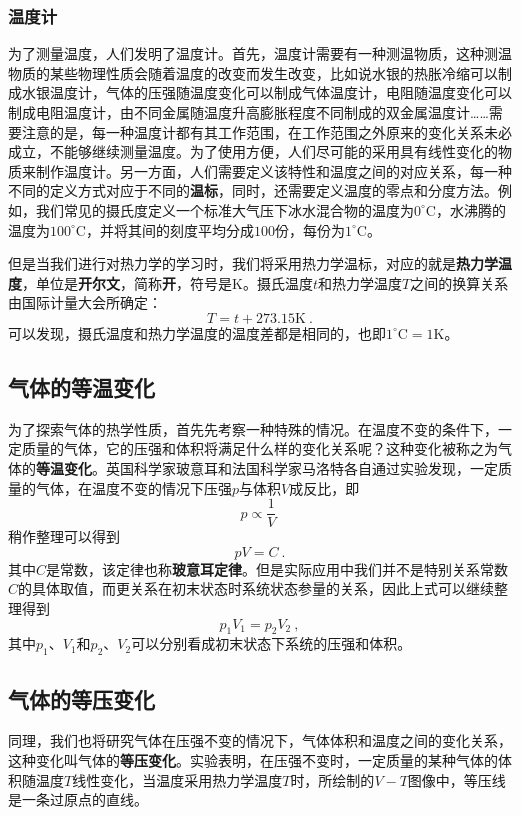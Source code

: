 \subsubsection{温度计}
为了测量温度，人们发明了温度计。首先，温度计需要有一种测温物质，这种测温物质的某些物理性质会随着温度的改变而发生改变，比如说水银的热胀冷缩可以制成水银温度计，气体的压强随温度变化可以制成气体温度计，电阻随温度变化可以制成电阻温度计，由不同金属随温度升高膨胀程度不同制成的双金属温度计……需要注意的是，每一种温度计都有其工作范围，在工作范围之外原来的变化关系未必成立，不能够继续测量温度。为了使用方便，人们尽可能的采用具有线性变化的物质来制作温度计。另一方面，人们需要定义该特性和温度之间的对应关系，每一种不同的定义方式对应于不同的\textbf{温标}，同时，还需要定义温度的零点和分度方法。例如，我们常见的摄氏度定义一个标准大气压下冰水混合物的温度为$0^\circ \mathrm{C}$，水沸腾的温度为$100^\circ \mathrm{C}$，并将其间的刻度平均分成$100$份，每份为$1^\circ \mathrm{C}$。

但是当我们进行对热力学的学习时，我们将采用热力学温标，对应的就是\textbf{热力学温度}，单位是\textbf{开尔文}，简称\textbf{开}，符号是$\mathrm{K}$。摄氏温度$t$和热力学温度$T$之间的换算关系由国际计量大会所确定：
$$T=t+273.15\mathrm{K}~.$$
可以发现，摄氏温度和热力学温度的温度差都是相同的，也即$1^\circ \mathrm{C}=1\mathrm{K}$。

\subsection{气体的等温变化}
为了探索气体的热学性质，首先先考察一种特殊的情况。在温度不变的条件下，一定质量的气体，它的压强和体积将满足什么样的变化关系呢？这种变化被称之为气体的\textbf{等温变化}。英国科学家玻意耳和法国科学家马洛特各自通过实验发现，一定质量的气体，在温度不变的情况下压强$p$与体积$V$成反比，即
$$p\propto\dfrac{1}{V}~$$
稍作整理可以得到
$$pV=C~.$$
其中$C$是常数，该定律也称\textbf{玻意耳定律}。但是实际应用中我们并不是特别关系常数$C$的具体取值，而更关系在初末状态时系统状态参量的关系，因此上式可以继续整理得到
$$p_1V_1=p_2V_2~,$$
其中$p_1$、$V_1$和$p_2$、$V_2$可以分别看成初末状态下系统的压强和体积。

\subsection{气体的等压变化}
同理，我们也将研究气体在压强不变的情况下，气体体积和温度之间的变化关系，这种变化叫气体的\textbf{等压变化}。实验表明，在压强不变时，一定质量的某种气体的体积随温度$T$线性变化，当温度采用热力学温度$T$时，所绘制的$V-T$图像中，等压线是一条过原点的直线。

